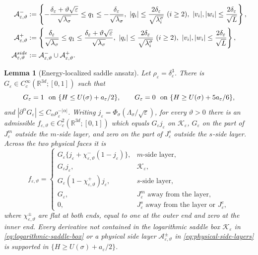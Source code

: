 \documentclass[10pt,a4paper]{amsart}
\newtheorem{lemma}{Lemma}
\newcommand{\R}{\mathbb R}
\newcommand{\eps}{\varepsilon}
\begin{document}
\begin{equation}
\label{eq:physical-side-layers}
\begin{aligned}
\mathcal A_{\eps,\vartheta}^-
&:=
\left\{
-\frac{\delta_\eps+\vartheta\sqrt\eps}{\sqrt{\lambda_\sigma}}
\le q_1\le
-\frac{\delta_\eps}{\sqrt{\lambda_\sigma}},\
|q_i|\le\frac{2\delta_\eps}{\sqrt{\lambda_i^\sigma}}\ (i\ge2),\
|v_i|,|w_i|\le\frac{2\delta_\eps}{\sqrt L}
\right\},\\
\mathcal A_{\eps,\vartheta}^+
&:=
\left\{
\frac{\delta_\eps}{\sqrt{\lambda_\sigma}}
\le q_1\le
\frac{\delta_\eps+\vartheta\sqrt\eps}{\sqrt{\lambda_\sigma}},\
|q_i|\le\frac{2\delta_\eps}{\sqrt{\lambda_i^\sigma}}\ (i\ge2),\
|v_i|,|w_i|\le\frac{2\delta_\eps}{\sqrt L}
\right\},\\
\mathcal A_{\eps,\vartheta}^{\rm side}
&:=\mathcal A_{\eps,\vartheta}^-\cup\mathcal A_{\eps,\vartheta}^+.
\end{aligned}
\end{equation}

\begin{lemma}[Energy-localized saddle ansatz]
\label{lem:global-saddle-test-function}
Let $\rho_\eps=\delta_\eps^3$.  There is
$G_\eps\in C_c^\infty(\R^{3d};[0,1])$ such that
\begin{equation}
\label{eq:energy-cutoff-properties}
G_\eps=1\ \hbox{ on }\{H\le U(\sigma)+a_\eps/2\},\qquad
G_\eps=0\ \hbox{ on }\{H\ge U(\sigma)+5a_\eps/6\},
\end{equation}
and $|\partial^\alpha G_\eps|\le C_\alpha\rho_\eps^{-|\alpha|}$.
Writing $j_\eps=\Phi_\sigma(\Lambda_\sigma/\sqrt\eps)$, for every $\vartheta>0$
there is an admissible $f_{\eps,\vartheta}\in C_c^2(\R^{3d};[0,1])$ which equals
$G_\eps j_\eps$ on $\mathcal K_\eps$, $G_\eps$ on the part of $J_\eps^m$
outside the $m$-side layer, and zero on the part of $J_\eps^s$ outside the
$s$-side layer.  Across the two physical faces it is
\begin{equation}
\label{eq:piecewise-energy-saddle-test}
f_{\eps,\vartheta}=
\begin{cases}
G_\eps\{j_\eps+\chi_{\eps,\vartheta}^-(1-j_\eps)\},&m\text{-side layer},\\
G_\eps j_\eps,&\mathcal K_\eps,\\
G_\eps(1-\chi_{\eps,\vartheta}^+)j_\eps,&s\text{-side layer},\\
G_\eps,&J_\eps^m\text{ away from the layer},\\
0,&J_\eps^s\text{ away from the layer or }J_\eps^c,
\end{cases}
\end{equation}
where $\chi_{\eps,\vartheta}^\pm$ are flat at both ends, equal to one at the
outer end and zero at the inner end.
Every derivative not contained in the
logarithmic saddle box $\mathcal K_\eps$ in
\eqref{eq:logarithmic-saddle-box} or a physical side layer
$\mathcal A_{\eps,\vartheta}^\pm$ in \eqref{eq:physical-side-layers} is supported in
$\{H\ge U(\sigma)+a_\eps/2\}$.
\end{lemma}
\end{document}
